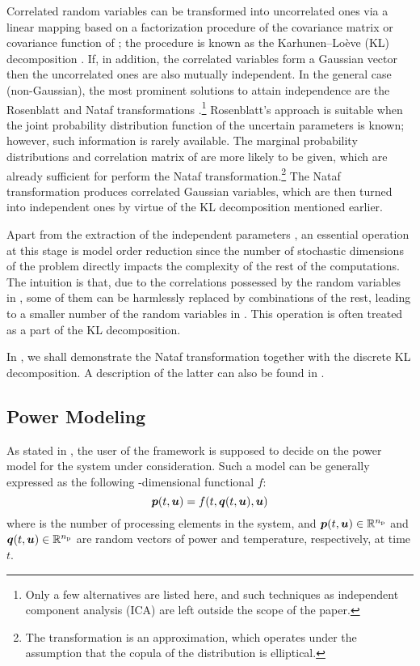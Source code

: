 Correlated random variables can be transformed into uncorrelated ones via a
linear mapping based on a factorization procedure of the covariance matrix or
covariance function of \vu; the procedure is known as the Karhunen--Lo\`{e}ve
(KL) decomposition \cite{ghanem1991}. If, in addition, the correlated variables
form a Gaussian vector then the uncorrelated ones are also mutually independent.
In the general case (non-Gaussian), the most prominent solutions to attain
independence are the Rosenblatt \cite{rosenblatt1952} and Nataf transformations
\cite{li2008}.\footnote{Only a few alternatives are listed here, and such
techniques as independent component analysis (ICA) are left outside the scope of
the paper.} Rosenblatt's approach is suitable when the joint probability
distribution function of the uncertain parameters \vu is known; however, such
information is rarely available. The marginal probability distributions and
correlation matrix of \vu are more likely to be given, which are already
sufficient for perform the Nataf transformation.\footnote{The transformation is
an approximation, which operates under the assumption that the copula of the
distribution is elliptical.} The Nataf transformation produces correlated
Gaussian variables, which are then turned into independent ones by virtue of the
KL decomposition mentioned earlier.

Apart from the extraction of the independent parameters \vz, an essential
operation at this stage is model order reduction since the number of stochastic
dimensions of the problem directly impacts the complexity of the rest of the
computations. The intuition is that, due to the correlations possessed by the
random variables in \vu, some of them can be harmlessly replaced by combinations
of the rest, leading to a smaller number of the random variables in \vz. This
operation is often treated as a part of the KL decomposition.

In , we shall demonstrate the Nataf transformation
together with the discrete KL decomposition. A description of the latter can
also be found in .

\subsection{Power Modeling}

As stated in , the user of the framework is supposed
to decide on the power model for the system under consideration. Such a model
can be generally expressed as the following \np-dimensional functional $f$:
\begin{equation} \elab{power-model}
  \vp(t, \vu) = f(t, \vq(t, \vu), \vu)
\end{equation}
where \np is the number of processing elements in the system, and $\boldsymbol{p}(t, \boldsymbol{u})
\in \mathbb{R}^{n_\mathrm{p}}$ and $\boldsymbol{q}(t, \boldsymbol{u}) \in \mathbb{R}^{n_\mathrm{p}}$ are random vectors of power and
temperature, respectively, at time $t$.

